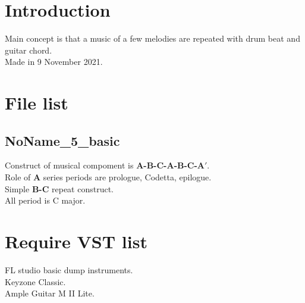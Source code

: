 \documentclass{article}
\author{Seycho Han}
\begin{document}
\begin{CJK}{UTF8}{ipxm}

\section{Introduction}
Main concept is that a music of a few melodies are repeated with drum beat and guitar chord.\\
Made in 9 November 2021.
\\
\section{File list}
\subsection{NoName\_5\_basic}
Construct of musical compoment is \textbf{A-B-C-A-B-C-A$'$}.\\
Role of \textbf{A} series periods are prologue, Codetta, epilogue.\\
Simple \textbf{B-C} repeat construct.\\
All period is C major.
\\

\section{Require VST list}
FL studio basic dump instruments\cite{flstudio}.\\
Keyzone Classic\cite{keyzone}.\\
Ample Guitar M II Lite\cite{ampleguitar}.
\\




\end{CJK}
\end{document}
